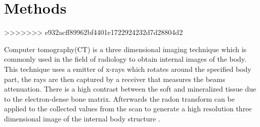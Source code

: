 \documentclass[
a4paper, 
12pt,
grayscalebody, %
abstract=on,
twoside, BCOR10mm, 12pt, DIV13,headinclude, footexclude, final, abstracton, openright
]{ibireprt}
\numberwithin{equation}{chapter}
\numberwithin{table}{chapter}
\numberwithin{figure}{chapter}
\numberwithin{algorithm}{chapter}
\numberwithin{example}{chapter}
\numberwithin{example}{chapter}
\begin{document}
\chapter{Methods}
>>>>>>> e932acff89962bf4401e1722924232d7d28804d2

	Computer tomography(CT) is a three dimensional imaging technique which is commonly used in the field of radiology  to obtain internal images of the body. This technique uses a emitter of x-rays which rotates around the specified body part, the rays are then captured by a receiver that measures the beams attenuation. There is a high contrast between the soft and mineralized tissue  due to the electron-dense bone matrix. Afterwards the radon transform can be applied to the collected values from the scan to generate a high resolution three dimensional image of the internal body structure \cite{Burghardt2011}.
\end{document}
